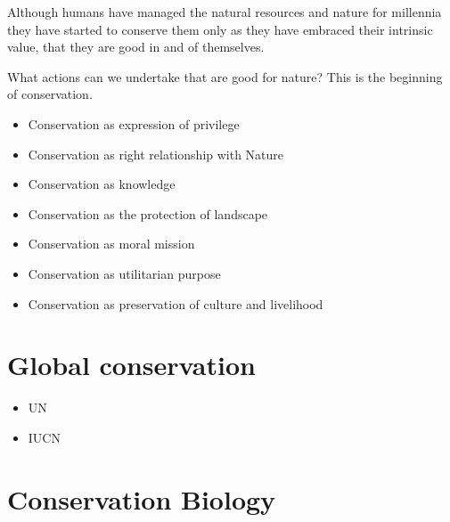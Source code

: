 \documentclass[
  ignorenonframetext,
]{beamer}
\providecommand{\tightlist}{%
  \setlength{\itemsep}{0pt}\setlength{\parskip}{0pt}}\usepackage{longtable,booktabs,array}
\begin{document}
\begin{frame}
Although humans have managed the natural resources and nature for
millennia they have started to conserve them only as they have embraced
their intrinsic value, that they are good in and of themselves.

What actions can we undertake that are good for nature? This is the
beginning of conservation.
\end{frame}

\begin{frame}
\begin{itemize}
\tightlist
\item
  Conservation as expression of privilege
\item
  Conservation as right relationship with Nature
\item
  Conservation as knowledge
\item
  Conservation as the protection of landscape
\item
  Conservation as moral mission
\item
  Conservation as utilitarian purpose
\item
  Conservation as preservation of culture and livelihood
\end{itemize}
\end{frame}

\hypertarget{global-conservation}{%
\section{Global conservation}\label{global-conservation}}

\begin{frame}
\begin{itemize}
\tightlist
\item
  UN
\item
  IUCN
\end{itemize}
\end{frame}

\hypertarget{conservation-biology}{%
\section{Conservation Biology}\label{conservation-biology}}
\end{document}
